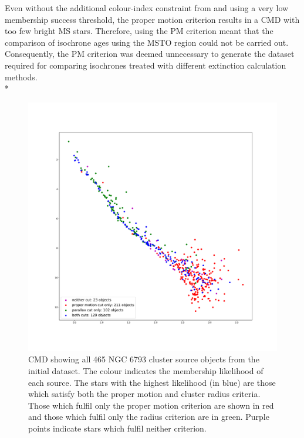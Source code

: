 \documentclass[12pt, a4paper]{report}
\begin{document}
Even without the additional colour-index constraint from \cite{2003ARep...47..263K} and using a very low membership success threshold, the proper motion criterion results in a CMD with too few bright MS stars. Therefore, using the PM criterion meant that the comparison of isochrone ages using the MSTO region could not be carried out. Consequently, the PM criterion was deemed unnecessary to generate the dataset required for comparing isochrones treated with different extinction calculation methods. \\*

\begin{figure}[h!]
\begin{center}
\includegraphics[width=1.0\textwidth]{../NGC6793_pm3sig_vs_plx_cuts_obs_cmd_schilbach.pdf}
\caption{CMD showing all 465 NGC 6793 cluster source objects from the initial dataset. The colour indicates the membership likelihood of each source. The stars with the highest likelihood (in blue) are those which satisfy both the proper motion and cluster radius criteria. Those which fulfil only the proper motion criterion are shown in red and those which fulfil only the radius criterion are in green. Purple points indicate stars which fulfil neither criterion.}
\label{NGC_6793_cut_effects}
\end{center}
\end{figure}
\end{document}
